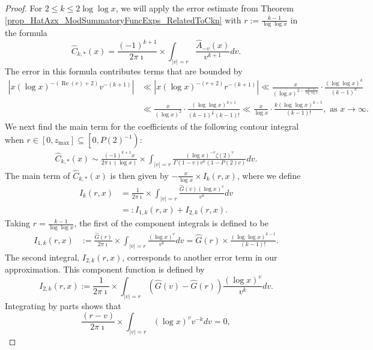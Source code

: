 \documentclass[11pt,reqno,a4letter]{article}
\newcommand{\hlocalref}[1]{\hyperref[#1]{\ref{#1}}}
\numberwithin{equation}{section}
\numberwithin{figure}{section}
\numberwithin{table}{section}
\newcommand{\cf}{\textit{cf.\ }}
\theoremstyle{plain}
\numberwithin{theorem}{section}
\theoremstyle{definition}
\renewcommand{\Re}{\operatorname{Re}}
\begin{document}
\begin{proof}
For $2 \leq k \leq 2\log\log x$, we will apply the error estimate from 
Theorem \hlocalref{prop_HatAzx_ModSummatoryFuncExps_RelatedToCkn} with 
$r := \frac{k-1}{\log\log x}$ in the formula 
\[
\widehat{C}_{k,\ast}(x) = \frac{(-1)^{k+1}}{2\pi\imath} \times \int_{|v|=r} 
     \frac{\widehat{A}_{-v}(x)}{v^{k+1}} dv. 
\]
The error in this formula 
contributes terms that are bounded by 
\begin{align*} 
\left\lvert x (\log x)^{-(\Re(v)+2)} v^{-(k+1)} \right\rvert & \ll 
     \left\lvert x (\log x)^{-(r+2)} r^{-(k+1)} \right\rvert 
     \ll \frac{x}{(\log x)^{2-\frac{k-1}{\log\log x}}} \cdot 
     \frac{(\log\log x)^{k}}{(k-1)^{k}} \\ 
     & \ll \frac{x}{(\log x)^2} \cdot \frac{(\log\log x)^{k+1}}{(k-1)^{\frac{1}{2}} (k-1)!} 
     \ll \frac{x}{\log x} \cdot \frac{k (\log\log x)^{k-5}}{(k-1)!}, 
     \text{ as } x \rightarrow \infty. 
\end{align*} 
We next find the main term for the coefficients 
of the following contour integral when 
$r \in [0, z_{\max}] \subseteq \left[0, P(2)^{-1}\right)$: 
\begin{align} 
\label{eqn_WideTildeArx_CountourIntDef_v1} 
\widehat{C}_{k,\ast}(x) \sim  
     \frac{(-1)^{k+1} x}{2\pi\imath (\log x)} 
     \times \int_{|v|=r} \frac{(\log x)^{-v} \zeta(2)^{v}}{\Gamma(1 - v) 
     v^{k} (1 - P(2) v)} dv. 
\end{align} 
The main term of $\widehat{C}_{k,\ast}(x)$ 
is then given by $-\frac{x}{\log x} \times I_k(r, x)$, where we define 
\begin{align*}
I_k(r, x) & = \frac{1}{2\pi\imath} \times \int_{|v|=r} 
     \frac{\widehat{G}(v) (\log x)^{v}}{v^k} dv \\ 
     & =: I_{1,k}(r, x) + I_{2,k}(r, x). 
\end{align*}
Taking $r = \frac{k-1}{\log\log x}$, the 
first of the component integrals is defined to be 
\begin{align*}
I_{1,k}(r, x) & := \frac{\widehat{G}(r)}{2\pi\imath} \times \int_{|v|=r} 
     \frac{(\log x)^{v}}{v^k} dv = \widehat{G}(r) \times \frac{(\log\log x)^{k-1}}{(k-1)!}. 
\end{align*}
The second integral, $I_{2,k}(r, x)$, corresponds to another error term in our approximation. 
This component function is defined by 
\[
I_{2,k}(r, x) := \frac{1}{2\pi\imath} \times \int_{|v|=r} 
     \left(\widehat{G}(v) - \widehat{G}(r)\right) 
     \frac{(\log x)^{v}}{v^k} dv. 
\]
Integrating by parts shows that \cite[\cf Thm.\ 7.19; \S 7.4]{MV} 
\[
\frac{(r-v)}{2\pi\imath} \times \int_{|v|=r} (\log x)^v v^{-k} dv = 0, 
\]
\end{proof}
\end{document}
